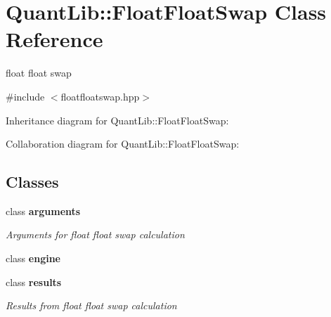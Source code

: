 \section{Quant\+Lib\+:\+:Float\+Float\+Swap Class Reference}
\label{class_quant_lib_1_1_float_float_swap}


float float swap  




{\ttfamily \#include $<$floatfloatswap.\+hpp$>$}



Inheritance diagram for Quant\+Lib\+:\+:Float\+Float\+Swap\+:


Collaboration diagram for Quant\+Lib\+:\+:Float\+Float\+Swap\+:
\subsection*{Classes}
\begin{DoxyCompactItemize}
\item 
class {\bf arguments}
\begin{DoxyCompactList}\small\item\em Arguments for float float swap calculation \end{DoxyCompactList}\item 
class {\bf engine}
\item 
class {\bf results}
\begin{DoxyCompactList}\small\item\em Results from float float swap calculation \end{DoxyCompactList}\end{DoxyCompactItemize}
